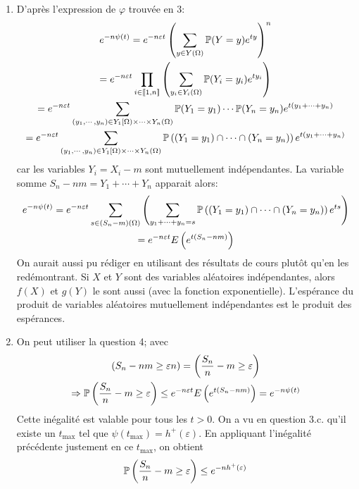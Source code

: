 \begin{enumerate}
\item D'après l'expression de $\varphi$ trouvée en $3$:
\begin{multline*}
 e^{-n\psi(t)} = e^{-n\varepsilon t}\left( \sum_{y\in Y(\Omega)}\mathbb{P}(Y = y)e^{ty}\right)^{n} \\
 = e^{-n\varepsilon t}\prod_{i\in \llbracket 1,n\rrbracket} \left( \sum_{y_i\in Y_i(\Omega)}\mathbb{P}(Y_i = y_i)e^{ty_i}\right) \\
 = e^{-n\varepsilon t} \sum_{(y_1,\cdots,y_n)\in Y_1[\Omega)\times\cdots\times Y_n(\Omega)}\mathbb{P}(Y_1=y_1)\cdots \mathbb{P}(Y_n=y_n)e^{t(y_1+\cdots+y_n)}\\
 = e^{-n\varepsilon t} \sum_{(y_1,\cdots,y_n)\in Y_1[\Omega)\times\cdots\times Y_n(\Omega)}\mathbb{P}\left( (Y_1=y_1)\cap \cdots \cap (Y_n=y_n)\right) e^{t(y_1+\cdots+y_n)}
\end{multline*}
car les variables $Y_i = X_i-m$ sont mutuellement indépendantes. La variable somme $S_n -nm=Y_1+\cdots+Y_n$ apparait alors:
\begin{multline*}
e^{-n\psi(t)} =
e^{-n\varepsilon t} \sum_{s\in (S_n-m)(\Omega)} \left( \sum_{ y_1 + \cdots + y_n = s}\mathbb{P}\left( (Y_1=y_1)\cap \cdots \cap (Y_n=y_n)\right) e^{ts}\right) \\
= e^{-n\varepsilon t}E\left( e^{t(S_n-nm)}\right)
\end{multline*}
On aurait aussi pu rédiger en utilisant des résultats de cours plutôt qu'en les redémontrant. Si $X$ et $Y$ sont des variables aléatoires indépendantes, alors $f(X)$ et $g(Y)$ le sont aussi (avec la fonction exponentielle). L'espérance du produit de variables aléatoires mutuellement indépendantes est le produit des espérances. 

\item On peut utiliser la question 4; avec
\begin{multline*}
 \left( S_n-nm \geq \varepsilon n\right) = \left( \frac{S_n}{n}-m \geq \varepsilon\right) \\
 \Rightarrow
 \mathbb{P} \left( \frac{S_n}{n}-m \geq \varepsilon\right) \leq e^{-n\varepsilon t}E\left( e^{t(S_n-nm)}\right)
 = e^{-n\psi(t)}
\end{multline*}
Cette inégalité est valable pour tous les $t>0$. On a vu en question 3.c. qu'il existe un $t_{\text{max}}$ tel que $\psi(t_{\text{max}})=h^+(\varepsilon)$. En appliquant l'inégalité précédente justement en ce $t_{\text{max}}$, on obtient
\begin{displaymath}
 \mathbb{P} \left( \frac{S_n}{n}-m \geq \varepsilon\right) \leq e^{-nh^+(\varepsilon)}
\end{displaymath}

\end{enumerate}



